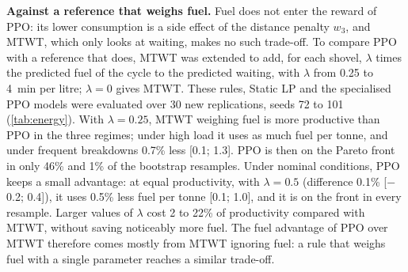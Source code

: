 \documentclass[11pt,a4paper]{article}
\newif\ifrevmarks
\newcommand{\revtag}[1]{\ifrevmarks\textsuperscript{\textcolor{red!70!black}{\scriptsize[#1]}}\fi}
\newenvironment{revbloc}[1]{\par\ifrevmarks\color{revcolor}\noindent\revtag{#1}\ \fi}{\par}
\newif\ifcorrmarks
\newcommand{\corr}[1]{\ifcorrmarks\textcolor{corrcolor}{#1}\else#1\fi}
\newenvironment{corrbloc}{\par\ifcorrmarks\color{corrcolor}\fi}{\par}
\begin{document}
\begin{revbloc}{T31}
\begin{corrbloc}
\textbf{Against a reference that weighs fuel.} Fuel does not enter the reward of PPO: its lower consumption is a side effect of the distance penalty $w_3$, and MTWT, which only looks at waiting, makes no such trade-off. To compare PPO with a reference that does, MTWT was extended to add, for each shovel, $\lambda$ times the predicted fuel of the cycle to the predicted waiting, with $\lambda$ from 0.25 to 4~min per litre; $\lambda = 0$ gives MTWT. These rules, \corr{Static LP} and the specialised PPO models were evaluated over 30 new replications, seeds 72 to 101 (\cref{tab:energy}). With $\lambda = 0.25$, MTWT weighing fuel is more productive than PPO in the three regimes; under high load it uses as much fuel per tonne, and under frequent breakdowns 0.7\% less [0.1; 1.3]. PPO is then on the Pareto front in only 46\% and 1\% of the bootstrap resamples. Under nominal conditions, PPO keeps a small advantage: at equal productivity, with $\lambda = 0.5$ (difference 0.1\% [$-$0.2; 0.4]), it uses 0.5\% less fuel per tonne [0.1; 1.0], and it is on the front in every resample. Larger values of $\lambda$ cost 2 to 22\% of productivity compared with MTWT, without saving noticeably more fuel. The fuel advantage of PPO over MTWT therefore comes mostly from MTWT ignoring fuel: a rule that weighs fuel with a single parameter reaches a similar trade-off.


\end{corrbloc}
\end{revbloc}
\end{document}
